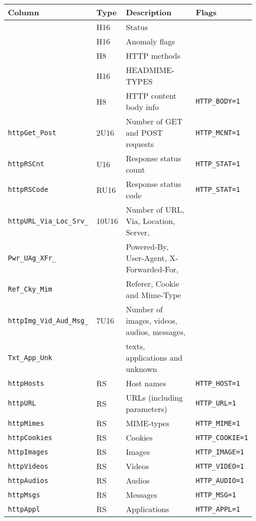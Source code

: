 \documentclass[documentation]{subfiles}
\begin{document}
\begin{longtable}{llll}
    \toprule
    {\bf Column} & {\bf Type} & {\bf Description} & {\bf Flags}\\
    \midrule\endhead%
    {\tt \nameref{httpStat}} & H16 & Status & \\
    {\tt \nameref{httpAFlags}} & H16 & Anomaly flags  & \\
    {\tt \nameref{httpMethods}} & H8 & HTTP methods & \\
    {\tt \nameref{httpHeadMimes}} & H16 & HEADMIME-TYPES & \\
    {\tt \nameref{httpCFlags}} & H8 & HTTP content body info & {\tt HTTP\_BODY=1}\\
    {\tt httpGet\_Post} & 2U16 & Number of GET and POST requests & {\tt HTTP\_MCNT=1}\\
    {\tt httpRSCnt}  & U16 & Response status count & {\tt HTTP\_STAT=1}\\
    {\tt httpRSCode} & RU16 & Response status code  & {\tt HTTP\_STAT=1}\\
    {\tt httpURL\_Via\_Loc\_Srv\_} & 10U16 & Number of URL, Via, Location, Server,\\
    {\tt \qquad Pwr\_UAg\_XFr\_} && \qquad Powered-By, User-Agent, X-Forwarded-For,\\
    {\tt \qquad Ref\_Cky\_Mim}   && \qquad Referer, Cookie and Mime-Type\\
    {\tt httpImg\_Vid\_Aud\_Msg\_} & 7U16 & Number of images, videos, audios, messages,\\
    {\tt \qquad Txt\_App\_Unk}           && \qquad texts, applications and unknown\\
    {\tt httpHosts}   & RS & Host names   & {\tt HTTP\_HOST=1}\\
    {\tt httpURL}     & RS & URLs (including parameters) & {\tt HTTP\_URL=1}\\
    {\tt httpMimes}   & RS & MIME-types   & {\tt HTTP\_MIME=1}\\
    {\tt httpCookies} & RS & Cookies      & {\tt HTTP\_COOKIE=1}\\
    {\tt httpImages}  & RS & Images       & {\tt HTTP\_IMAGE=1}\\
    {\tt httpVideos}  & RS & Videos       & {\tt HTTP\_VIDEO=1}\\
    {\tt httpAudios}  & RS & Audios       & {\tt HTTP\_AUDIO=1}\\
    {\tt httpMsgs}    & RS & Messages     & {\tt HTTP\_MSG=1}\\
    {\tt httpAppl}    & RS & Applications & {\tt HTTP\_APPL=1}\\

\end{longtable}
\end{document}

